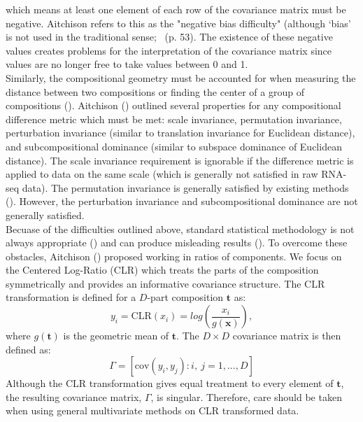 \documentclass{article}\usepackage[]{graphicx}\usepackage[]{color}
\begin{document}
which means at least one element of each row of the covariance matrix must be negative. Aitchison refers to this as the "negative bias difficulty" (although `bias' is not used in the traditional sense;~\cite{Aitchison1986} (p. 53). The existence of these negative values creates problems for the interpretation of the covariance matrix since values are no longer free to take values between 0 and 1.\\

Similarly, the compositional geometry must be accounted for when measuring the distance between two compositions or finding the center of a group of compositions (\cite{Aitchison2000}).  Aitchison (\cite{Aitchison1992}) outlined several properties for any compositional difference metric which must be met: scale invariance, permutation invariance, perturbation invariance (similar to translation invariance for Euclidean distance), and subcompositional dominance (similar to subspace dominance of Euclidean distance).  The scale invariance requirement is ignorable if the difference metric is applied to data on the same scale (which is generally not satisfied in raw RNA-seq data). The permutation invariance is generally satisfied by existing methods (\cite{Martin-Fernandez1998}). However, the perturbation invariance and subcompositional dominance are not generally satisfied. \\


Becuase of the difficulties outlined above, standard statistical methodology is not always appropriate (\cite{Aitchison1986}) and can produce misleading results (\cite{Lovell2015}).  To overcome these obstacles, Aitchison (\cite{Aitchison1980}) proposed working in ratios of components. We focus on the Centered Log-Ratio (CLR) which treats the parts of the composition symmetrically and provides an informative covariance structure.  The CLR transformation is defined for a $D$-part composition $\mathbf{t}$ as:
\begin{equation}
y_i  = \text{CLR}(x_i) = log \left(\frac{x_i}{g(\mathbf{x})} \right),
\label{clr}
\end{equation}
where $g(\mathbf{t})$ is the geometric mean of $\mathbf{t}$.  The $D \times D$ covariance matrix is then defined as:
\begin{equation}
\Gamma = \left[\text{cov}\left(y_i, y_j \right): i,\ j = 1, ..., D \right]
\label{gamma}
\end{equation}
Although the CLR transformation gives equal treatment to every element of $\mathbf{t}$, the resulting covariance matrix, $\Gamma$, is singular.  Therefore, care should be taken when using general multivariate methods on CLR transformed data.\\
\end{document}
